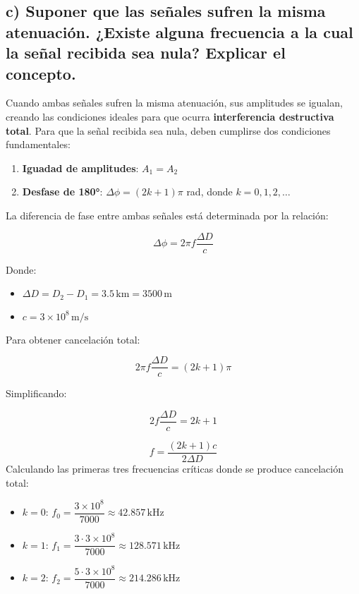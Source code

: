 \subsection*{c) Suponer que las señales sufren la misma atenuación. ¿Existe alguna frecuencia a la cual la señal recibida sea nula? Explicar el concepto.}

Cuando ambas señales sufren la misma atenuación, sus amplitudes se igualan, creando las condiciones ideales para que ocurra \textbf{interferencia destructiva 
total}. Para que la señal recibida sea nula, deben cumplirse dos condiciones fundamentales:

    \begin{enumerate}
        \item \textbf{Iguadad de amplitudes}: $A_1 = A_2$
        \item \textbf{Desfase de 180°}: $\Delta\phi = (2k+1)\pi$ rad, donde $k = 0, 1, 2, \ldots$
    \end{enumerate}

La diferencia de fase entre ambas señales está determinada por la relación:

    \[
        \Delta\phi = 2\pi f \frac{\Delta D}{c}
    \]

Donde:
    \begin{itemize}
        \item $\Delta D = D_2 - D_1 = 3.5 \, \text{km} = 3500 \, \text{m}$
        \item $c = 3 \times 10^8 \, \text{m/s}$
    \end{itemize}

Para obtener cancelación total:

    \[
        2\pi f \frac{\Delta D}{c} = (2k+1)\pi
    \]

Simplificando:

    \[
        2f \frac{\Delta D}{c} = 2k+1
    \]

    \[
        f = \frac{(2k+1)c}{2\Delta D}
    \]
Calculando las primeras tres frecuencias críticas donde se produce cancelación total:
    \begin{itemize}
        \item $k = 0$: $f_0 = \dfrac{3 \times 10^8}{7000} \approx 42.857 \, \text{kHz}$
        \item $k = 1$: $f_1 = \dfrac{3 \cdot 3 \times 10^8}{7000} \approx 128.571 \, \text{kHz}$
        \item $k = 2$: $f_2 = \dfrac{5 \cdot 3 \times 10^8}{7000} \approx 214.286 \, \text{kHz}$
    \end{itemize}

